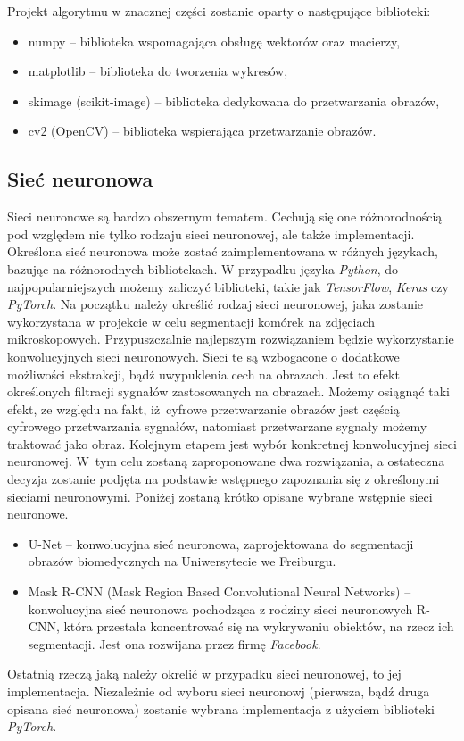 \documentclass[a4paper]{article}
\begin{document}
Projekt algorytmu w znacznej części zostanie oparty o następujące biblioteki:
\begin{itemize}
    \item numpy -- biblioteka wspomagająca obsługę wektorów oraz macierzy,
    \item matplotlib -- biblioteka do tworzenia wykresów,
    \item skimage (scikit-image) -- biblioteka dedykowana do przetwarzania obrazów,
    \item cv2 (OpenCV) -- biblioteka wspierająca przetwarzanie obrazów.
\end{itemize}

\subsection{Sieć neuronowa}
Sieci neuronowe są bardzo obszernym tematem. Cechują się one różnorodnością pod względem nie tylko rodzaju sieci neuronowej, ale także implementacji. Określona sieć neuronowa może zostać zaimplementowana w różnych językach, bazując na różnorodnych bibliotekach. W przypadku języka \textit{Python}, do najpopularniejszych możemy zaliczyć biblioteki, takie jak \textit{TensorFlow}, \textit{Keras} czy \textit{PyTorch}.
\newline \newline
Na początku należy określić rodzaj sieci neuronowej, jaka zostanie wykorzystana w projekcie w celu segmentacji komórek na zdjęciach mikroskopowych. Przypuszczalnie najlepszym rozwiązaniem będzie wykorzystanie konwolucyjnych sieci neuronowych. Sieci te są wzbogacone o dodatkowe możliwości ekstrakcji, bądź uwypuklenia cech na obrazach. Jest to efekt określonych filtracji sygnałów zastosowanych na obrazach. Możemy osiągnąć taki efekt, ze względu na fakt, iż~cyfrowe przetwarzanie obrazów jest częścią cyfrowego przetwarzania sygnałów, natomiast przetwarzane sygnały możemy traktować jako obraz.
\newline
Kolejnym etapem jest wybór konkretnej konwolucyjnej sieci neuronowej. W~tym celu zostaną zaproponowane dwa rozwiązania, a ostateczna decyzja zostanie podjęta na podstawie wstępnego zapoznania się z określonymi sieciami neuronowymi. Poniżej zostaną krótko opisane wybrane wstępnie sieci neuronowe.
\begin{itemize}
    \item U-Net -- konwolucyjna sieć neuronowa, zaprojektowana do segmentacji obrazów biomedycznych na Uniwersytecie we Freiburgu.
    \item Mask R-CNN (Mask Region Based Convolutional Neural Networks) -- konwolucyjna sieć neuronowa pochodząca z rodziny sieci neuronowych R-CNN, która przestała koncentrować się na wykrywaniu obiektów, na rzecz ich segmentacji. Jest ona rozwijana przez firmę \textit{Facebook}.
\end{itemize}
Ostatnią rzeczą jaką należy okrelić w przypadku sieci neuronowej, to jej implementacja. Niezależnie od wyboru sieci neuronowj (pierwsza, bądź druga opisana sieć neuronowa) zostanie wybrana implementacja z użyciem biblioteki \textit{PyTorch}. 
\end{document}

